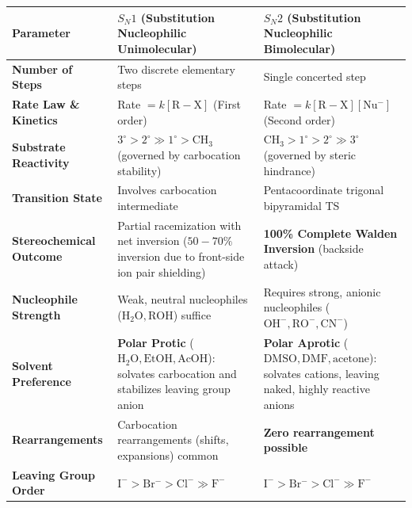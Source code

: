 \documentclass[10pt,twoside,openright]{book}
\begin{document}
\begin{formulabox}
{\footnotesize\setlength{\tabcolsep}{3.0pt}
\begin{tabularx}{\linewidth}{|l|Y|Y|}
\hline
\textbf{Parameter} & \textbf{\texorpdfstring{$S_N1$}{SN1} (Substitution Nucleophilic Unimolecular)} & \textbf{\texorpdfstring{$S_N2$}{SN2} (Substitution Nucleophilic Bimolecular)} \\
\hline
\textbf{Number of Steps} & Two discrete elementary steps & Single concerted step \\
\hline
\textbf{Rate Law \& Kinetics} & Rate $= k[\mathrm{R-X}]$ (First order) & Rate $= k[\mathrm{R-X}][\mathrm{Nu^-}]$ (Second order) \\
\hline
\textbf{Substrate Reactivity} & $3^\circ > 2^\circ \gg 1^\circ > \mathrm{CH_3}$ (governed by carbocation stability) & $\mathrm{CH_3} > 1^\circ > 2^\circ \gg 3^\circ$ (governed by steric hindrance) \\
\hline
\textbf{Transition State} & Involves carbocation intermediate & Pentacoordinate trigonal bipyramidal TS \\
\hline
\textbf{Stereochemical Outcome} & Partial racemization with net inversion ($50-70\%$ inversion due to front-side ion pair shielding) & \textbf{100\% Complete Walden Inversion} (backside attack) \\
\hline
\textbf{Nucleophile Strength} & Weak, neutral nucleophiles ($\mathrm{H_2O, ROH}$) suffice & Requires strong, anionic nucleophiles ($\mathrm{OH^-, RO^-, CN^-}$) \\
\hline
\textbf{Solvent Preference} & \textbf{Polar Protic} ($\mathrm{H_2O, EtOH, AcOH}$): solvates carbocation and stabilizes leaving group anion & \textbf{Polar Aprotic} ($\mathrm{DMSO, DMF, \text{acetone}}$): solvates cations, leaving naked, highly reactive anions \\
\hline
\textbf{Rearrangements} & Carbocation rearrangements (shifts, expansions) common & \textbf{Zero rearrangement possible} \\
\hline
\textbf{Leaving Group Order} & $\mathrm{I^- > Br^- > Cl^- \gg F^-}$ & $\mathrm{I^- > Br^- > Cl^- \gg F^-}$ \\
\hline
\end{tabularx}}
\end{formulabox}
\end{document}
